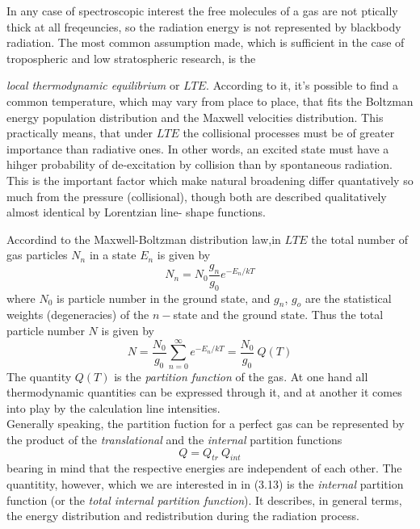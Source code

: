 In any case of spectroscopic interest the free molecules of a gas are
not ptically thick at all freqeuncies, so the radiation energy is not
represented by blackbody radiation. The most common assumption made,
which is sufficient in the case of tropospheric and low stratospheric
research, is the {\textit{local thermodynamic equilibrium\nocorr} or $LTE$. According to it,
it's possible to find a common temperature, which may vary from place
to place, that fits the Boltzman energy population distribution and
the Maxwell velocities distribution. This practically means, that
under $LTE$ the collisional processes must be of greater importance
than radiative ones. In other words, an excited state must have a
hihger probability of de-excitation by collision than by spontaneous
radiation. This is the important factor which make natural broadening
differ quantatively so much from the pressure (collisional), though
both are described qualitatively almost identical by  Lorentzian line-
shape functions.

Accordind  to the Maxwell-Boltzman distribution law,in $LTE$ the total number
of gas particles $N_n$  in a state $E_n$ is given by 
\begin{equation}
 N_n=N_0\frac{g_n}{g_0}e^{-E_n/kT}
\label{}
\end{equation}
where $N_0$ is particle number in the ground state, and $g_n$, $g_o$
are the statistical weights (degeneracies) of the $n-$state and the
ground state. Thus the total particle number $N$ is given by
\begin{equation}
 N=\frac{N_0}{g_0}\sum_{n=0}^\infty e^{-E_n/kT}=\frac{N_0}{g_0}~Q(T)
\label{}
\end{equation}
The quantity $Q(T)$ is the {\it{partition function}\nocorr} of the gas. At
one hand all thermodynamic quantities can be expressed through it, and at
another it comes into play by the calculation line intensities.\\
Generally speaking, the partition fuction for a perfect gas can be
represented by the product of the {\it{translational}\nocorr} and the {\it{internal}\nocorr} partition functions
\begin{equation}
 Q  =  Q_{tr}~Q_{int}
\label{}
\end{equation}
bearing in mind that the respective energies are independent of each
other. The quantitity, however, which we are interested in in (3.13)
is the {\it{internal}\nocorr} partition function (or the  {\it{total internal
    partition function}\nocorr}). It describes, in general terms, the energy
distribution and redistribution during the radiation process. 

}
